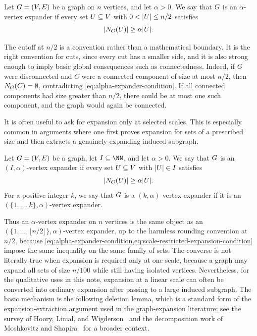 \begin{definition}
	\label{def:alpha-expander}
	Let \(G=(V,E)\) be a graph on \(n\) vertices, and let \(\alpha>0\). We say that \(G\) is an \(\alpha\)-vertex expander if every set \(U\subseteq V\) with \(0<\lvert U\rvert\leq n/2\) satisfies
	\begin{equation}
		\label{eq:alpha-expander-condition}
		\lvert N_{G}(U)\rvert\geq \alpha\lvert U\rvert.
	\end{equation}
\end{definition}

The cutoff at \(n/2\) is a convention rather than a mathematical boundary. It is the right convention for cuts, since every cut has a smaller side, and it is also strong enough to imply basic global consequences such as connectedness. Indeed, if \(G\) were disconnected and \(C\) were a connected component of size at most \(n/2\), then \(N_{G}(C)=\emptyset\), contradicting \cref{eq:alpha-expander-condition}. If all connected components had size greater than \(n/2\), there could be at most one such component, and the graph would again be connected.

It is often useful to ask for expansion only at selected scales. This is especially common in arguments where one first proves expansion for sets of a prescribed size and then extracts a genuinely expanding induced subgraph.

\begin{definition}
	\label{def:scale-restricted-expansion}
	Let \(G=(V,E)\) be a graph, let \(I\subseteq\NN\), and let \(\alpha>0\). We say that \(G\) is an \((I,\alpha)\)-vertex expander if every set \(U\subseteq V\) with \(\lvert U\rvert\in I\) satisfies
	\begin{equation}
		\label{eq:scale-restricted-expansion-condition}
		\lvert N_{G}(U)\rvert\geq \alpha\lvert U\rvert.
	\end{equation}
	For a positive integer \(k\), we say that \(G\) is a \((k,\alpha)\)-vertex expander if it is an \((\{1,\ldots,k\},\alpha)\)-vertex expander.
\end{definition}

Thus an \(\alpha\)-vertex expander on \(n\) vertices is the same object as an \((\{1,\ldots,\lfloor n/2\rfloor\},\alpha)\)-vertex expander, up to the harmless rounding convention at \(n/2\), because \cref{eq:alpha-expander-condition,eq:scale-restricted-expansion-condition} impose the same inequality on the same family of sets. The converse is not literally true when expansion is required only at one scale, because a graph may expand all sets of size \(n/100\) while still having isolated vertices. Nevertheless, for the qualitative uses in this note, expansion at a linear scale can often be converted into ordinary expansion after passing to a large induced subgraph. The basic mechanism is the following deletion lemma, which is a standard form of the expansion-extraction argument used in the graph-expansion literature; see the survey of Hoory, Linial, and Wigderson~\cite{HLW2006} and the decomposition work of Moshkovitz and Shapira~\cite{SODA:MosSha15} for a broader context.

